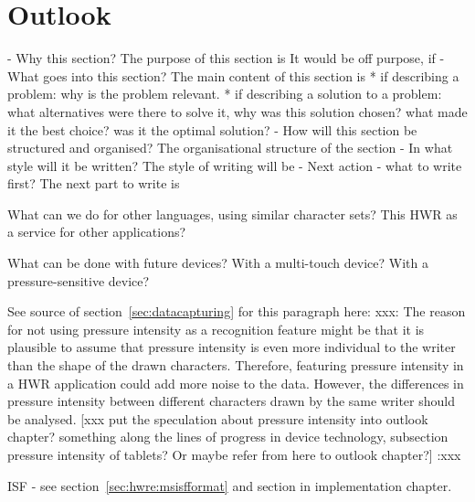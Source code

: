 
\chapter{Outlook}

- Why this section? 
  The purpose of this section is 
  It would be off purpose, if 
- What goes into this section?
  The main content of this section is 
  * if describing a problem: why is the problem relevant.
  * if describing a solution to a problem: what alternatives were
    there to solve it, why was this solution chosen? 
    what made it the best choice? was it the optimal solution?
- How will this section be structured and organised?
  The organisational structure of the section 
- In what style will it be written?
  The style of writing will be 
- Next action - what to write first?
  The next part to write is

What can we do for other languages, using similar character sets?
This HWR as a service for other applications?

What can be done with future devices?
With a multi-touch device?
With a pressure-sensitive device?

See source of section~\ref{sec:datacapturing} for this paragraph here:
xxx: 
The reason for not using pressure intensity as a recognition feature might be 
that it is plausible to assume that pressure intensity is even more individual 
to the writer than the shape of the drawn characters. 
Therefore, featuring pressure intensity in a HWR application could add more 
noise to the data. However, the differences in pressure intensity 
between different characters drawn by the same writer should be analysed.
[xxx put the speculation about pressure intensity into outlook chapter? 
something along the lines of progress in device technology, 
subsection pressure intensity of tablets? Or maybe refer from here to
outlook chapter?] 
:xxx


ISF - see section~\ref{sec:hwre:msisfformat} and section in 
implementation chapter.
